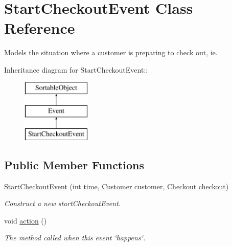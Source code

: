 \hypertarget{class_start_checkout_event}{
\section{StartCheckoutEvent Class Reference}
\label{class_start_checkout_event}
}
Models the situation where a customer is preparing to check out, ie.  


Inheritance diagram for StartCheckoutEvent::\begin{figure}[H]
\begin{center}
\leavevmode
\includegraphics[height=3cm]{class_start_checkout_event}
\end{center}
\end{figure}
\subsection*{Public Member Functions}
\begin{CompactItemize}
\item 
\hyperlink{class_start_checkout_event_54269b423446f7a7272c3fb8ac2795ed}{StartCheckoutEvent} (int \hyperlink{class_event_d4c0fbb00c3fd993405df98bafcd52c5}{time}, \hyperlink{class_customer}{Customer} customer, \hyperlink{class_checkout}{Checkout} \hyperlink{class_start_checkout_event_3db09638992a567fbbf7a62e5d877a86}{checkout})
\begin{CompactList}\small\item\em Construct a new startCheckoutEvent. \item\end{CompactList}\item 
void \hyperlink{class_start_checkout_event_84fa31ea480e52721e62eee452d87e0e}{action} ()
\begin{CompactList}\small\item\em The method called when this event \char`\"{}happens\char`\"{}. \item\end{CompactList}\end{CompactItemize}
